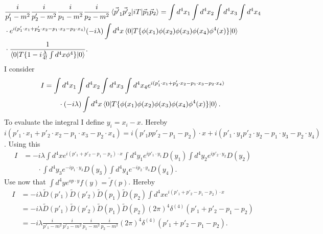 \begin{example}
\begin{enumerate}
\begin{equation}
			\begin{split}
				&\frac{i}{p'_1-m^2}\frac{i}{p'_2-m^2}\frac{i}{p_1-m^2}\frac{i}{p_2-m^2}\braket{\vec{p'}_1\vec{p'}_2|iT|\vec{p}_1\vec{p}_2}=\int d^4x_1\int d^4x_2\int d^4x_3\int d^4x_4\\
				&\cdot e^{i(p'_1\cdot x_1+p'_2\cdot x_2-p_1\cdot x_3-p_2\cdot x_4)}(-i\lambda)\int d^4x\braket{0|T\{\phi(x_1)\phi(x_2)\phi(x_3)\phi(x_4)\phi^4(x)\}|0}\\
				&\cdot\frac{1}{\braket{0|T\{1-i\frac{\lambda}{4!}\int d^4x \phi^4\}|0}}.
			\end{split}
		\end{equation} 
		I consider
		\begin{equation}
			\begin{split}
				I&=\int d^4x_1\int d^4x_2\int d^4x_3\int d^4x_4e^{i(p'_1\cdot x_1+p'_2\cdot x_2-p_1\cdot x_3-p_2\cdot x_4)}\\
				&\qquad\cdot(-i\lambda)\int d^4x\braket{0|T\{\phi(x_1)\phi(x_2)\phi(x_3)\phi(x_4)\phi^4(x)\}|0}.
			\end{split}
		\end{equation}  
		To evaluate the integral I define $y_i=x_i-x$. Hereby $i(p'_1\cdot x_1+p'_2\cdot x_2-p_1\cdot x_3-p_2\cdot x_4)=i(p'_1pp'_2-p_1-p_2)\cdot x+i(p'_1\cdot y_1p'_2\cdot y_2-p_1\cdot y_3-p_2\cdot y_4)$. Using this
		\begin{equation}
			\begin{split}
				I&=-i\lambda\int d^4xe^{i(p'_1+p'_2-p_1-p_2)\cdot x}\int d^4y_1e^{ip'_1\cdot y_1}D(y_1)\int d^4y_2e^{ip'_2\cdot y_2}D(y_2)\\
				&\qquad\cdot \int d^4y_3e^{-ip_1\cdot y_3}D(y_3)\int d^4y_4e^{-ip_2\cdot y_4}D(y_4).
			\end{split}
		\end{equation}  
		Use now that $\int d^4y e^{op\cdot y}f(y)=\tilde{f}(p)$. Hereby
		\begin{equation}
			\begin{split}
				I&=-i\lambda \tilde{D}(p'_1)\tilde{D}(p'_2)\tilde{D}(p_1)\tilde{D}(p_2)\int d^4xe^{i(p'_1+p'_2-p_1-p_2)\cdot x}\\
				&=-i\lambda \tilde{D}(p'_1)\tilde{D}(p'_2)\tilde{D}(p_1)\tilde{D}(p_2)(2\pi)^4\delta^{(4)}(p'_1+p'_2-p_1-p_2)\\
				&=-i\lambda \frac{i}{p'_1-m^2}\frac{i}{p'_2-m^2}\frac{i}{p_1-m^2}\frac{i}{p_2-m^2}(2\pi)^4\delta^{(4)}(p'_1+p'_2-p_1-p_2).\\
			\end{split}
		\end{equation} 

\end{enumerate}
\end{example}
